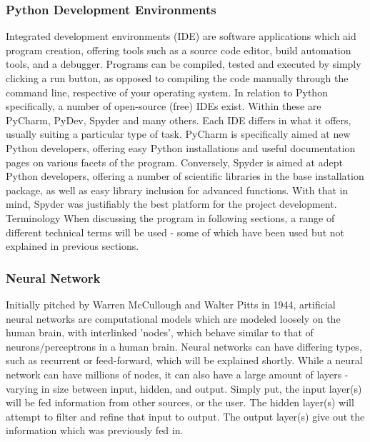 \documentclass[12pt,a4paper]{article}
\makeatletter
\renewcommand\subsection{\@startsection {subsection}{1}{2mm}
                               {3pt plus 2pt minus 1pt}
                               {3pt plus 0pt}
                               {\normalfont\bfseries}}
\makeatother
\begin{document}
\subsubsection{Python Development Environments}
Integrated development environments (IDE) are software applications which aid program creation, offering tools such as a source code editor, build automation tools, and a debugger. Programs can be compiled, tested and executed by simply clicking a run button, as opposed to compiling the code manually through the command line, respective of your operating system. In relation to Python specifically, a number of open-source (free) IDEs exist. Within these are PyCharm, PyDev, Spyder and many others. Each IDE differs in what it offers, usually suiting a particular type of task. PyCharm is specifically aimed at new Python developers, offering easy Python installations and useful documentation pages on various facets of the program. Conversely, Spyder is aimed at adept Python developers, offering a number of scientific libraries in the base installation package, as well as easy library inclusion for advanced functions. With that in mind, Spyder was justifiably the best platform for the project development. \\

\subsection{Terminology}
When discussing the program in following sections, a range of different technical terms will be used - some of which have been used but not explained in previous sections.

\subsubsection{Neural Network}
Initially pitched by Warren McCullough and Walter Pitts in 1944, artificial neural networks are computational models which are modeled loosely on the human brain, with interlinked 'nodes', which behave similar to that of neurons/perceptrons in a human brain. Neural networks can have differing types, such as recurrent or feed-forward, which will be explained shortly. While a neural network can have millions of nodes, it can also have a large amount of layers - varying in size between input, hidden, and output. Simply put, the input layer(s) will be fed information from other sources, or the user. The hidden layer(s) will attempt to filter and refine that input to output. The output layer(s) give out the information which was previously fed in.
\end{document}
